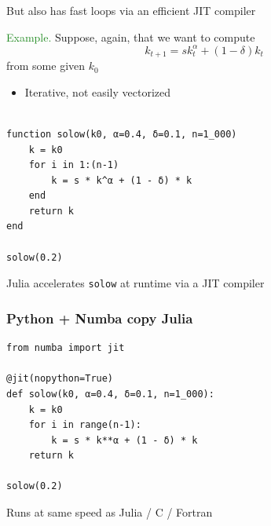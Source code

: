 \documentclass[
    xcolor={svgnames,dvipsnames},
    hyperref={colorlinks, citecolor=DeepPink4, linkcolor=DarkRed, urlcolor=DarkBlue}
    ]{beamer}  %
\newcommand{\Eg}{\textcolor{ForestGreen}{Example. }}
\newcommand{\1}{\mathbbm 1}
\begin{document}
\begin{frame}
    
    But also has fast loops via an efficient JIT compiler

    \vspace{0.5em}
    \vspace{0.5em}
    \Eg Suppose, again, that we want to compute 
    \begin{equation*}
        k_{t+1} = s k_t^\alpha + (1 - \delta) k_t
    \end{equation*}
    from some given $k_0$ 


    \vspace{0.5em}
    \vspace{0.5em}
    \vspace{0.5em}
    \vspace{0.5em}
    \begin{itemize}
        \item Iterative, not easily vectorized
    \end{itemize}

\end{frame}


\begin{frame}[fragile]
    
    \begin{verbatim}

function solow(k0, α=0.4, δ=0.1, n=1_000)
    k = k0
    for i in 1:(n-1)
        k = s * k^α + (1 - δ) * k
    end
    return k
end

solow(0.2)
    \end{verbatim}

    \vspace{0.5em}
    \vspace{0.5em}
    \vspace{0.5em}
    \vspace{0.5em}

    Julia accelerates \texttt{solow} at runtime via a JIT compiler

\end{frame}

\begin{frame}[fragile]
    \frametitle{Python + Numba copy Julia}
    
    \begin{verbatim}
from numba import jit

@jit(nopython=True)
def solow(k0, α=0.4, δ=0.1, n=1_000):
    k = k0
    for i in range(n-1):
        k = s * k**α + (1 - δ) * k
    return k

solow(0.2)
    \end{verbatim}


    Runs at same speed as Julia / C / Fortran

\end{frame}
\end{document}
